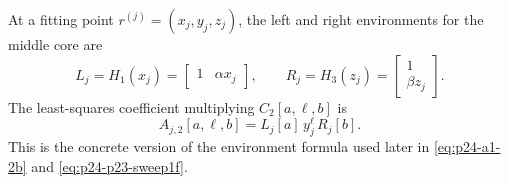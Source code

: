 \documentclass[11pt]{article}
\numberwithin{equation}{section}
\begin{document}
At a fitting point \(r^{(j)}=(x_j,y_j,z_j)\), the left and right environments
for the middle core are
\begin{equation}
    L_j=H_1(x_j)=\begin{bmatrix}1&\alpha x_j\end{bmatrix},
    \qquad
    R_j=H_3(z_j)=\begin{bmatrix}1\\ \beta z_j\end{bmatrix}.
    \label{eq:p30-tt-example-20}
\end{equation}
The least-squares coefficient multiplying \(C_2[a,\ell,b]\) is
\begin{equation}
    A_{j,2}[a,\ell,b]
    =
    L_j[a]\,y_j^\ell\,R_j[b].
    \label{eq:p30-tt-example-21}
\end{equation}
This is the concrete version of the environment formula used later in
\eqref{eq:p24-a1-2b} and \eqref{eq:p24-p23-sweep1f}.
\end{document}

